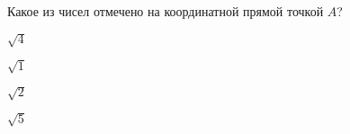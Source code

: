 \begin{ex}
	\begin{condition}
		Какое из чисел отмечено на координатной прямой точкой $A$?
		
		\selectanswer
		\begin{enumcols}[columns=4]
			\item $\sqrt{4}$
			\item $\sqrt{1}$
			\item $\sqrt{2}$
			\item $\sqrt{5}$
		\end{enumcols}
	\end{condition}
\end{ex}